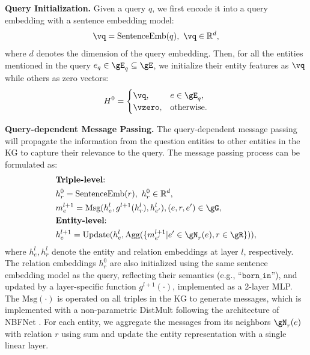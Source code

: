 \noindent\textbf{Query Initialization.} Given a query $q$, we first encode it into a query embedding with a sentence embedding model:
\begin{equation}
    \setlength\abovedisplayskip{2pt}%
    \setlength\belowdisplayskip{2pt}
    \vq = \text{SentenceEmb}(q),~\vq\in\mathbb{R}^d,
\end{equation}
where $d$ denotes the dimension of the query embedding. Then, for all the entities mentioned in the query $e_q\in\gE_q\subseteq\gE$, we initialize their entity features as $\vq$ while others as zero vectors:
\begin{equation}
    \setlength\abovedisplayskip{1pt}%
    \setlength\belowdisplayskip{1pt}
    H^0 = \begin{cases}
        \vq, & e\in\gE_q, \\
        \vzero, & \text{otherwise}.
    \end{cases}
\end{equation}

\noindent\textbf{Query-dependent Message Passing.} The query-dependent message passing will propagate the information from the question entities to other entities in the KG to capture their relevance to the query. The message passing process can be formulated as:
%
\begin{align}
    & \text{\textbf{Triple-level}: } \nonumber \\
    & h^0_r = \text{SentenceEmb}(r),~h^0_r\in\mathbb{R}^d, \\
    & m_e^{l+1} = \text{Msg}(h_e^l,g^{l+1}(h_r^l),h_{e'}^l), (e,r,e')\in\gG, \\
    & \text{\textbf{Entity-level}: } \nonumber \\
    & h_e^{l+1} = \text{Update}(h_e^l,\text{Agg}(\{m_{e'}^{l+1} | e'\in\gN_r(e),r\in\gR\})),
\end{align}
where $h^l_e, h^l_r$ denote the entity and relation embeddings at layer $l$, respectively. The relation embeddings $ h^0_r$ are also initialized using the same sentence embedding model as the query, reflecting their semantics (e.g., ``$\texttt{born\_in}$''), and updated by a layer-specific function $g^{l+1}(\cdot)$, implemented as a 2-layer MLP.
The $\text{Msg}(\cdot)$ is operated on all triples in the KG to generate messages, which is implemented with a non-parametric DistMult \citep{yang2015embedding} following the architecture of NBFNet \citep{zhu2021neural}. For each entity, we aggregate the messages from its neighbors $\gN_r(e)$ with relation $r$ using sum and update the entity representation with a single linear layer.


